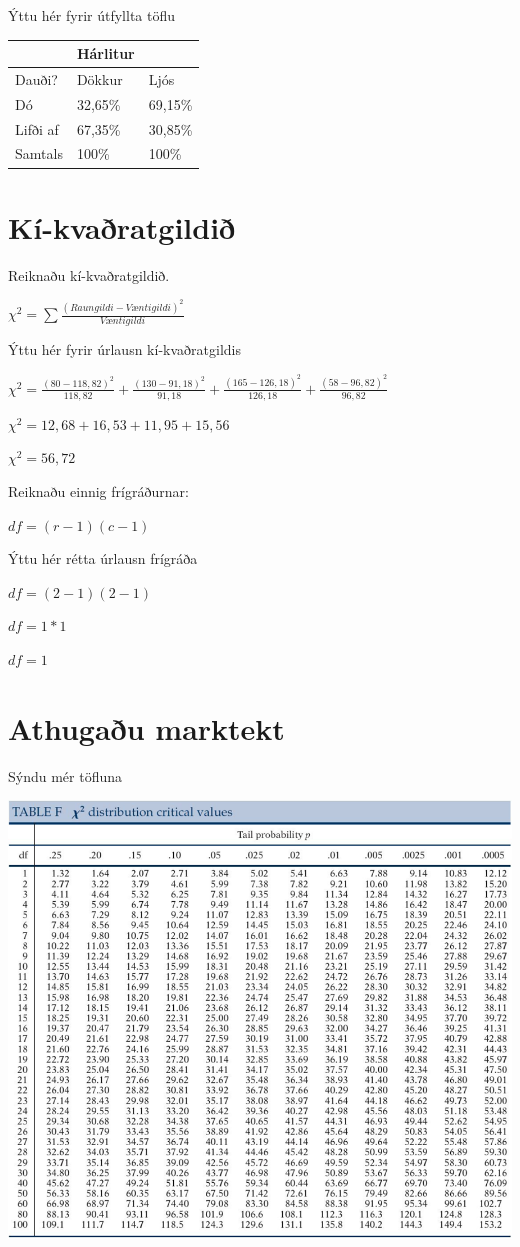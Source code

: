 \documentclass[
]{book}
\begin{document}
Ýttu hér fyrir útfyllta töflu

\begin{longtable}[]{@{}lll@{}}
\toprule()
& Hárlitur & \\
\midrule()
\endhead
Dauði? & Dökkur & Ljós \\
Dó & 32,65\% & 69,15\% \\
Lifði af & 67,35\% & 30,85\% \\
Samtals & 100\% & 100\% \\
\bottomrule()
\end{longtable}

\hypertarget{kuxed-kvauxf0ratgildiuxf0}{%
\section{Kí-kvaðratgildið}\label{kuxed-kvauxf0ratgildiuxf0}}

Reiknaðu kí-kvaðratgildið.

\({\chi}^2=\sum\frac{(Raungildi-Væntigildi)^2}{Væntigildi}\)

Ýttu hér fyrir úrlausn kí-kvaðratgildis

\({\chi}^2 = \frac{(80 - 118,82)^2}{118,82} + \frac{(130 - 91,18)^2}{91,18} + \frac{(165 - 126,18)^2}{126,18} + \frac{(58 - 96,82)^2}{96,82}\)

\({\chi}^2 = 12,68 + 16,53 + 11,95 + 15,56\)

\({\chi}^2 = 56,72\)

Reiknaðu einnig frígráðurnar:

\(df = (r-1)(c-1)\)

Ýttu hér rétta úrlausn frígráða

\(df = (2-1)(2-1)\)

\(df = 1*1\)

\(df = 1\)

\hypertarget{athugauxf0u-marktekt}{%
\section{Athugaðu marktekt}\label{athugauxf0u-marktekt}}

Sýndu mér töfluna

\includegraphics{images/image-2144503272.png}
\end{document}
